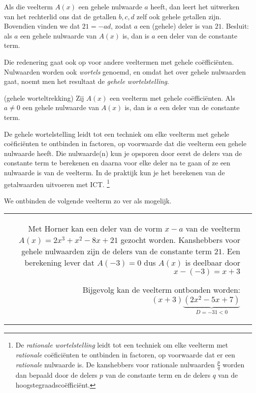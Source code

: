 \documentclass{ximera}
\begin{document}
Als die veelterm \(A(x)\) een gehele nulwaarde \(a\) heeft, dan leert het uitwerken van het rechterlid ons dat de getallen \(b,c,d\) zelf ook gehele getallen zijn. Bovendien vinden we dat \(21 = -ad\), zodat \(a\) een (gehele) deler is van \(21\). Besluit: als \(a\) een gehele nulwaarde van \(A(x)\) is, dan is \(a\) een deler van de constante term. 

Die redenering gaat ook op voor andere veeltermen met gehele coëfficiënten. Nulwaarden worden ook \textit{ wortels} genoemd, en omdat het over gehele nulwaarden gaat, noemt men het resultaat de \textit{ gehele wortelstelling}. 


\begin{theorem}(gehele worteltrekking)
Zij \(A(x)\) een veelterm met gehele coëfficiënten. Als \(a \neq 0\) een gehele nulwaarde van \(A(x)\) is, dan is \(a\) een deler van de constante term. 
\end{theorem} 



De gehele wortelstelling leidt tot een techniek om elke veelterm met gehele coëficiënten te ontbinden in factoren, op voorwaarde dat die veelterm een gehele nulwaarde heeft. Die nulwaarde(n) kun je opsporen door eerst de delers van de constante term te berekenen en daarna voor elke deler na te gaan of ze een nulwaarde is van de veelterm. In de praktijk kun je het berekenen van de getalwaarden uitvoeren met ICT. \footnote{De \textit{ rationale wortelstelling} leidt tot een techniek om elke veelterm met \textit{ rationale} coëficiënten 
te ontbinden in factoren, op voorwaarde dat er een \textit{ rationale} nulwaarde is. De kanshebbers voor rationale nulwaarden \(\frac{p}{q}\) worden dan bepaald door de delers \(p\) van de constante term en de delers \(q\) van de hoogstegraadscoëfficiënt.}

\begin{example} 
We ontbinden de volgende veelterm zo ver als mogelijk.
\renewcommand{\kolbreed}{\widthof{\(-21\)}}


\begin{tabular}{rl}

Met Horner kan een deler van de vorm \(x-a\) van de veelterm \(A(x) = 2x^3 + x^2 - 8x + 21\) gezocht worden. Kanshebbers voor gehele nulwaarden zijn de delers van de constante term \(21\). Een berekening lever dat \( A(-3) = 0 \) dus \(A(x)\) is deelbaar door \(x- (-3) = x+3\)





Bijgevolg kan de veelterm ontbonden worden: \( (x+3)\underbrace{(2x^2-5x+7)}_{D = -31 < 0} \)
\end{tabular}

\end{example} 
\end{document}
